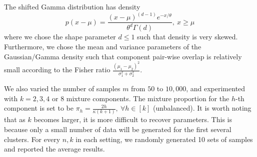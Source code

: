 \documentclass{article}
\begin{document}
The shifted Gamma distribution has density
$$p(x-\mu)=\frac{(x-\mu)^{(d-1)}e^{-x/\theta}}{\theta^d \Gamma(d)},~x\geq \mu$$
where we chose the shape parameter $d\le 1$ such that density is very skewed. Furthermore, we chose the mean and variance parameters of the Gaussian/Gamma density such that component pair-wise overlap is relatively small according to the Fisher ratio $\frac{(\mu_1 - \mu_2)^2}{\sigma_1^2+\sigma_2^2}$.

We also varied the number of samples $m$ from $50$ to $10,000$, and
experimented with $k=2,3,4$ or $8$ mixture components. The mixture proportion for the $h$-th component is set to be $\pi_h= \frac{2h}{\kappa(k+1)},~\forall h\in[k]$ (unbalanced). It is worth noting that as $k$ becomes larger, it is more difficult to recover parameters. This is because only a small number of data will be generated for the first several clusters. For every $n,k$ in each setting, we randomly generated 10 sets of samples and reported the average results.
\end{document}
